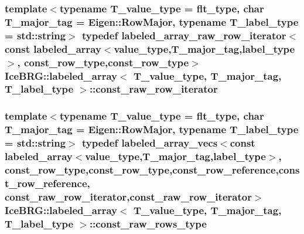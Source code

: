 \subsubsection[{const\+\_\+raw\+\_\+row\+\_\+iterator}]{\setlength{\rightskip}{0pt plus 5cm}template$<$typename T\+\_\+value\+\_\+type = flt\+\_\+type, char T\+\_\+major\+\_\+tag = Eigen\+::\+Row\+Major, typename T\+\_\+label\+\_\+type = std\+::string$>$ typedef {\bf labeled\+\_\+array\+\_\+raw\+\_\+row\+\_\+iterator}$<$const {\bf labeled\+\_\+array}$<${\bf value\+\_\+type},T\+\_\+major\+\_\+tag,{\bf label\+\_\+type}$>$, {\bf const\+\_\+row\+\_\+type},{\bf const\+\_\+row\+\_\+type}$>$ {\bf Ice\+B\+R\+G\+::labeled\+\_\+array}$<$ T\+\_\+value\+\_\+type, T\+\_\+major\+\_\+tag, T\+\_\+label\+\_\+type $>$\+::{\bf const\+\_\+raw\+\_\+row\+\_\+iterator}}\label{classIceBRG_1_1labeled__array_aeac7979069eab6c371dca3e6f3dd9ee9}
\hypertarget{classIceBRG_1_1labeled__array_adecd8b6c6343a2618a1c47c6f15b9ea2}{}
\subsubsection[{const\+\_\+raw\+\_\+rows\+\_\+type}]{\setlength{\rightskip}{0pt plus 5cm}template$<$typename T\+\_\+value\+\_\+type = flt\+\_\+type, char T\+\_\+major\+\_\+tag = Eigen\+::\+Row\+Major, typename T\+\_\+label\+\_\+type = std\+::string$>$ typedef {\bf labeled\+\_\+array\+\_\+vecs}$<$const {\bf labeled\+\_\+array}$<${\bf value\+\_\+type},T\+\_\+major\+\_\+tag,{\bf label\+\_\+type}$>$, {\bf const\+\_\+row\+\_\+type},{\bf const\+\_\+row\+\_\+type},{\bf const\+\_\+row\+\_\+reference},{\bf const\+\_\+row\+\_\+reference}, {\bf const\+\_\+raw\+\_\+row\+\_\+iterator},{\bf const\+\_\+raw\+\_\+row\+\_\+iterator}$>$ {\bf Ice\+B\+R\+G\+::labeled\+\_\+array}$<$ T\+\_\+value\+\_\+type, T\+\_\+major\+\_\+tag, T\+\_\+label\+\_\+type $>$\+::{\bf const\+\_\+raw\+\_\+rows\+\_\+type}}\label{classIceBRG_1_1labeled__array_adecd8b6c6343a2618a1c47c6f15b9ea2}
\hypertarget{classIceBRG_1_1labeled__array_a334a51a867cad5d5c4ad682ebe1fd5a9}{}
